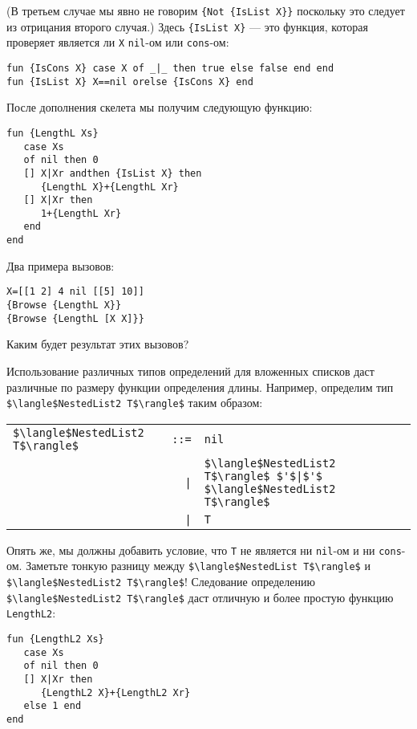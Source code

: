 (В третьем случае мы явно не говорим \lstinline!{Not {IsList X}}! поскольку это следует из отрицания второго случая.) Здесь \lstinline!{IsList X}! --- это функция, которая проверяет является ли \lstinline!X! \lstinline!nil!-ом или \lstinline!cons!-ом:

\begin{lstlisting}
fun {IsCons X} case X of _|_ then true else false end end
fun {IsList X} X==nil orelse {IsCons X} end
\end{lstlisting}

После дополнения скелета мы получим следующую функцию:

\begin{lstlisting}
fun {LengthL Xs}
   case Xs
   of nil then 0
   [] X|Xr andthen {IsList X} then
      {LengthL X}+{LengthL Xr}
   [] X|Xr then
      1+{LengthL Xr}
   end
end
\end{lstlisting}

Два примера вызовов:

\begin{lstlisting}
X=[[1 2] 4 nil [[5] 10]]
{Browse {LengthL X}}
{Browse {LengthL [X X]}}
\end{lstlisting}

Каким будет результат этих вызовов?

Использование различных типов определений для вложенных списков даст различные по размеру функции определения длины. Например, определим тип \lstinline!$\langle$NestedList2 T$\rangle$! таким образом:

\begin{tabular}{lrl}
  \lstinline!$\langle$NestedList2 T$\rangle$! & \lstinline!::=! & \lstinline!nil! \\
  & \lstinline!|! & \lstinline!$\langle$NestedList2 T$\rangle$ $'$|$'$ $\langle$NestedList2 T$\rangle$! \\
  & \lstinline!|! & \lstinline!T!
\end{tabular}

Опять же, мы должны добавить условие, что \lstinline!T! не является ни \lstinline!nil!-ом и ни \lstinline!cons!-ом. Заметьте тонкую разницу между \lstinline!$\langle$NestedList T$\rangle$! и \lstinline!$\langle$NestedList2 T$\rangle$!! Следование определению \lstinline!$\langle$NestedList2 T$\rangle$! даст отличную и более простую функцию \lstinline!LengthL2!:

\begin{lstlisting}
fun {LengthL2 Xs}
   case Xs
   of nil then 0
   [] X|Xr then
      {LengthL2 X}+{LengthL2 Xr}
   else 1 end
end
\end{lstlisting}

